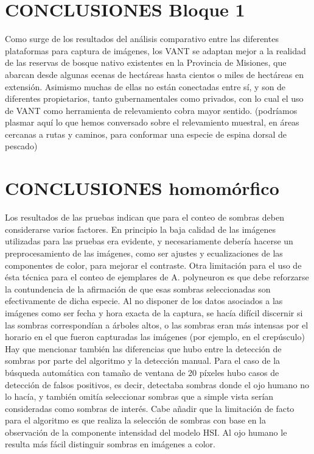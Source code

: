 \color{black} 
\section{CONCLUSIONES Bloque 1}
Como surge de los resultados del análisis comparativo entre las diferentes plataformas para captura de imágenes, los VANT se adaptan mejor a la realidad de las reservas de bosque nativo existentes en la Provincia de Misiones, que abarcan desde algunas ecenas de hectáreas hasta cientos o miles de hectáreas en extensión. Asimismo muchas de ellas no están conectadas entre sí, y son de diferentes propietarios, tanto gubernamentales como privados, con lo cual el uso de VANT como herramienta de relevamiento cobra mayor sentido. \color{magenta}(podríamos plasmar aquí lo que hemos conversado sobre el relevamiento muestral, en áreas cercanas a rutas y caminos, para conformar una especie de espina dorsal de pescado)
\color{black} 
\section{CONCLUSIONES homomórfico}
Los resultados de las pruebas indican que para el conteo de sombras deben considerarse varios factores. En principio la baja calidad de las imágenes utilizadas para las pruebas era evidente, y necesariamente debería hacerse un preprocesamiento de las imágenes, como ser ajustes y ecualizaciones de las componentes de color, para mejorar el contraste. Otra limitación para el uso de ésta técnica para el conteo de ejemplares de A. polyneuron es que debe reforzarse la contundencia de la afirmación de que esas sombras seleccionadas son efectivamente de dicha especie. Al no disponer de los datos asociados a las imágenes como ser fecha y hora exacta de la captura, se hacía difícil discernir si las sombras correspondían a árboles altos, o las sombras eran más intensas por el horario en el que fueron capturadas las imágenes (por ejemplo, en el crepúsculo) Hay que mencionar también las diferencias que hubo entre la detección de sombras por parte del algoritmo y la detección manual. Para el caso de la búsqueda automática con tamaño de ventana de 20 píxeles hubo casos de detección de falsos positivos, es decir, detectaba sombras donde el ojo humano no lo hacía, y también omitía seleccionar sombras que a simple vista serían consideradas como sombras de interés. Cabe añadir que la limitación de facto para el algoritmo es que realiza la selección de sombras con base en la observación de la componente intensidad del modelo HSI. Al ojo humano le resulta más fácil distinguir sombras en imágenes a color.

